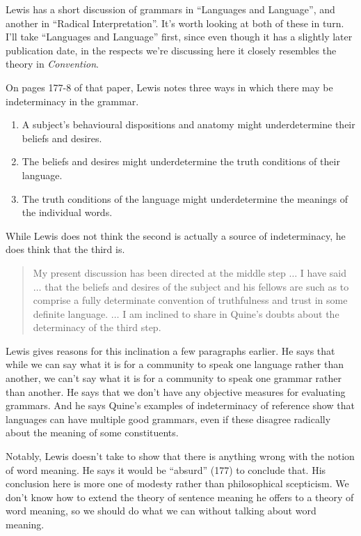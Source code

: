 Lewis has a short discussion of grammars in ``Languages and Language'', and another in ``Radical Interpretation''. It's worth looking at both of these in turn. I'll take ``Languages and Language'' first, since even though it has a slightly later publication date, in the respects we're discussing here it closely resembles the theory in \textit{Convention}.

On pages 177-8 of that paper, Lewis notes three ways in which there may be indeterminacy in the grammar.

\begin{enumerate}
\item A subject's behavioural dispositions and anatomy might underdetermine their beliefs and desires.
\item The beliefs and desires might underdetermine the truth conditions of their language.
\item The truth conditions of the language might underdetermine the meanings of the individual words.
\end{enumerate}

\noindent While Lewis does not think the second is actually a source of indeterminacy, he does think that the third is.

\begin{quote}
My present discussion has been directed at the middle step $\dots$ I have said $\dots$ that the beliefs and desires of the subject and his fellows are such as to comprise a fully determinate convention of truthfulness and trust in some definite language. $\dots$ I am inclined to share in Quine's doubts about the determinacy of the third step. \citep[178]{Lewis1975b}
\end{quote}

\noindent Lewis gives reasons for this inclination a few paragraphs earlier. He says that while we can say what it is for a community to speak one language rather than another, we can't say what it is for a community to speak one grammar rather than another. He says that we don't have any objective measures for evaluating grammars. And he says Quine's examples of indeterminacy of reference show that languages can have multiple good grammars, even if these disagree radically about the meaning of some constituents.

Notably, Lewis doesn't take to show that there is anything wrong with the notion of word meaning. He says it would be ``absurd'' (177) to conclude that. His conclusion here is more one of modesty rather than philosophical scepticism. We don't know how to extend the theory of sentence meaning he offers to a theory of word meaning, so we should do what we can without talking about word meaning.

